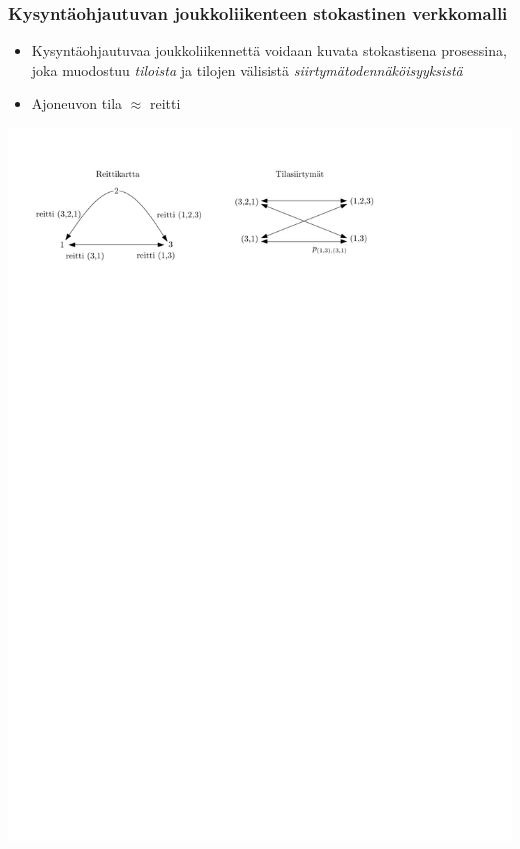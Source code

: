 \documentclass{beamer}
\begin{document}
    \begin{frame}
  \frametitle{Kysyntäohjautuvan joukkoliikenteen stokastinen verkkomalli}   %
\begin{itemize}
 \item 
 Kysyntäohjautuvaa joukkoliikennettä voidaan kuvata stokastisena prosessina, joka muodostuu
 \emph{tiloista} ja tilojen välisistä \emph{siirtymätodennäköisyyksistä}
 \item
 Ajoneuvon tila $\approx$ reitti %
\end{itemize}
\begin{center}
 \includegraphics[scale=0.65]{tilat01}
\end{center}

\end{frame}
\end{document}
